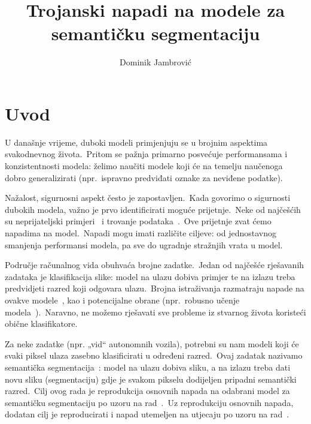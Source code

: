 \documentclass[times, utf8, seminar, numeric]{fer}
\begin{document}
\title{Trojanski napadi na modele za semantičku segmentaciju}

\author{Dominik Jambrović}


\maketitle

\tableofcontents

\chapter{Uvod}

U današnje vrijeme, duboki modeli primjenjuju se u brojnim aspektima svakodnevnog života.\ 
Pritom se pažnja primarno posvećuje performansama i konzistentnosti modela: želimo naučiti modele koji će na temelju naučenoga dobro generalizirati (npr.\ ispravno predviđati oznake za neviđene podatke).\
  
Nažalost, sigurnosni aspekt često je zapostavljen.\ Kada govorimo o sigurnosti dubokih modela, važno je prvo identificirati moguće prijetnje.\ 
Neke od najčešćih su neprijateljski primjeri~\cite{goodfellow2014explaining} i trovanje podataka~\cite{chen2017targeted}.\
Ove prijetnje zvat ćemo napadima na model.\ Napadi mogu imati različite ciljeve: od jednostavnog smanjenja performansi modela, pa sve do ugradnje stražnjih vrata u model.\
  
Područje računalnog vida obuhvaća brojne zadatke.\ Jedan od najčešće rješavanih zadataka je klasifikacija slike: model na ulazu dobiva primjer te na izlazu treba predvidjeti razred koji odgovara ulazu.\ 
Brojna istraživanja razmatraju napade na ovakve modele~\cite{goodfellow2014explaining}, kao i potencijalne obrane (npr.\ robusno učenje modela~\cite{madry2017towards}).\ Naravno, ne možemo rješavati sve probleme iz stvarnog života koristeći obične klasifikatore.\ 
  
Za neke zadatke (npr. „vid“ autonomnih vozila), potrebni su nam modeli koji će svaki piksel ulaza zasebno klasificirati u određeni razred.\ Ovaj zadatak nazivamo semantička segmentacija~\cite{garcia2017review}: 
model na ulazu dobiva sliku, a na izlazu treba dati novu sliku (segmentaciju) gdje je svakom pikselu dodijeljen pripadni semantički razred.\ 
Cilj ovog rada je reprodukcija osnovnih napada na odabrani model za semantičku segmentaciju po uzoru na rad~\cite{li2021hidden}.\
Uz reprodukciju osnovnih napada, dodatan cilj je reproducirati i napad utemeljen na utjecaju po uzoru na rad~\cite{lan2023influencer}.\
\end{document}
